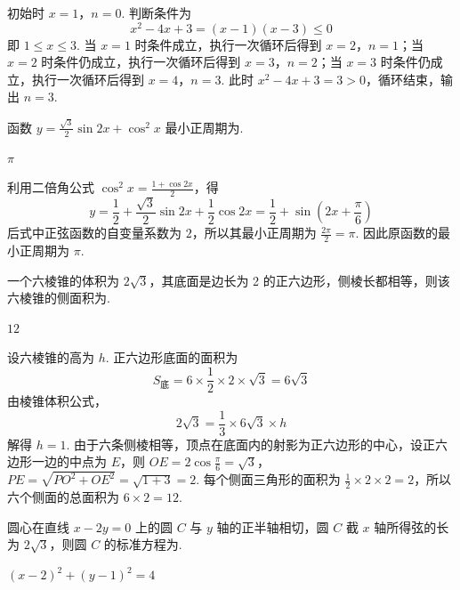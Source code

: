\begin{solution}
初始时 \(x=1\)，\(n=0\). 判断条件为
\[
x^2-4x+3=(x-1)(x-3)\leqslant0
\]
即 \(1\leqslant x\leqslant3\). 当 \(x=1\) 时条件成立，执行一次循环后得到 \(x=2\)，\(n=1\)；当 \(x=2\) 时条件仍成立，执行一次循环后得到 \(x=3\)，\(n=2\)；当 \(x=3\) 时条件仍成立，执行一次循环后得到 \(x=4\)，\(n=3\). 此时 \(x^2-4x+3=3>0\)，循环结束，输出 \(n=3\).
\end{solution}

\begin{problem}
函数 \( y = \frac{\sqrt{3}}{2} \sin 2x + \cos^2 x \) 最小正周期为\fillinblank{}.
\end{problem}

\begin{answer}
\(\pi\)
\end{answer}

\begin{solution}
利用二倍角公式 \(\cos^2x=\frac{1+\cos2x}{2}\)，得
\[
y=\frac12+\frac{\sqrt3}{2}\sin2x+\frac12\cos2x
 =\frac12+\sin\left(2x+\frac\pi6\right)
\]
后式中正弦函数的自变量系数为 \(2\)，所以其最小正周期为 \(\frac{2\pi}{2}=\pi\). 因此原函数的最小正周期为 \(\pi\).
\end{solution}

\begin{problem}
一个六棱锥的体积为 \(2\sqrt{3}\)，其底面是边长为 2 的正六边形，侧棱长都相等，则该六棱锥的侧面积为\fillinblank{}.
\end{problem}

\begin{answer}
\(12\)
\end{answer}

\begin{solution}
设六棱锥的高为 \(h\). 正六边形底面的面积为
\[
S_\text{底}=6\times\frac{1}{2}\times2\times\sqrt3=6\sqrt3
\]
由棱锥体积公式，
\[
2\sqrt3=\frac13\times6\sqrt3\times h
\]
解得 \(h=1\). 由于六条侧棱相等，顶点在底面内的射影为正六边形的中心，设正六边形一边的中点为 \(E\)，则
\(OE=2\cos\frac\pi6=\sqrt3\)，\(PE=\sqrt{PO^2+OE^2}=\sqrt{1+3}=2\).
每个侧面三角形的面积为 \(\frac12\times2\times2=2\)，所以六个侧面的总面积为 \(6\times2=12\).
\end{solution}

\begin{problem}
圆心在直线 \(x - 2y = 0\) 上的圆 \(C\) 与 \(y\) 轴的正半轴相切，圆 \(C\) 截 \(x\) 轴所得弦的长为 \(2\sqrt{3}\)，则圆 \(C\) 的标准方程为\fillinblank{}.
\end{problem}

\begin{answer}
\((x - 2)^2 + (y - 1)^2 = 4\)
\end{answer}


